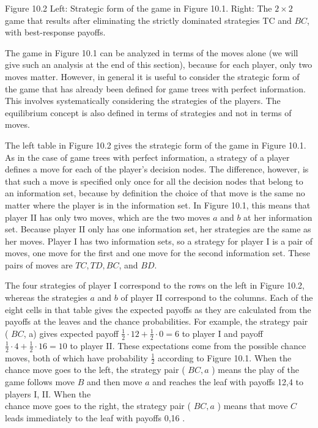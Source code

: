 \documentclass[12pt]{article}
\begin{document}
Figure 10.2 Left: Strategic form of the game in Figure 10.1. Right: The $2 \times 2$ game that results after eliminating the strictly dominated strategies TC and $B C$, with best-response payoffs.

The game in Figure 10.1 can be analyzed in terms of the moves alone (we will give such an analysis at the end of this section), because for each player, only two moves matter. However, in general it is useful to consider the strategic form of the game that has already been defined for game trees with perfect information. This involves systematically considering the strategies of the players. The equilibrium concept is also defined in terms of strategies and not in terms of moves.

The left table in Figure 10.2 gives the strategic form of the game in Figure 10.1. As in the case of game trees with perfect information, a strategy of a player defines a move for each of the player's decision nodes. The difference, however, is that such a move is specified only once for all the decision nodes that belong to an information set, because by definition the choice of that move is the same no matter where the player is in the information set. In Figure 10.1, this means that player II has only two moves, which are the two moves $a$ and $b$ at her information set. Because player II only has one information set, her strategies are the same as her moves. Player I has two information sets, so a strategy for player I is a pair of moves, one move for the first and one move for the second information set. These pairs of moves are $T C, T D, B C$, and $B D$.

The four strategies of player I correspond to the rows on the left in Figure 10.2, whereas the strategies $a$ and $b$ of player II correspond to the columns. Each of the eight cells in that table gives the expected payoffs as they are calculated from the payoffs at the leaves and the chance probabilities. For example, the strategy pair ( $B C$, a) gives expected payoff $\frac{1}{2} \cdot 12+\frac{1}{2} \cdot 0=6$ to player I and payoff $\frac{1}{2} \cdot 4+\frac{1}{2} \cdot 16=10$ to player II. These expectations come from the possible chance moves, both of which have probability $\frac{1}{2}$ according to Figure 10.1. When the chance move goes to the left, the strategy pair ( $B C, a$ ) means the play of the game follows move $B$ and then move $a$ and reaches the leaf with payoffs 12,4 to players I, II. When the\\
chance move goes to the right, the strategy pair ( $B C, a$ ) means that move $C$ leads immediately to the leaf with payoffs 0,16 .
\end{document}
